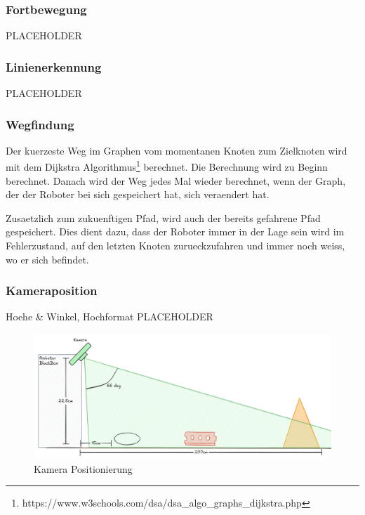 \subsubsection{Fortbewegung}

PLACEHOLDER

\subsubsection{Linienerkennung}

PLACEHOLDER

\subsubsection{Wegfindung}

Der kuerzeste Weg im Graphen vom momentanen Knoten zum Zielknoten wird mit dem Dijkstra Algorithmus\footnote{https://www.w3schools.com/dsa/dsa\_algo\_graphs\_dijkstra.php} berechnet. Die Berechnung wird zu Beginn berechnet. Danach wird der Weg jedes Mal wieder berechnet, wenn der Graph, der der Roboter bei sich gespeichert hat, sich veraendert hat.

Zusaetzlich zum zukuenftigen Pfad, wird auch der bereits gefahrene Pfad gespeichert. Dies dient dazu, dass der Roboter immer in der Lage sein wird im Fehlerzustand, auf den letzten Knoten zurueckzufahren und immer noch weiss, wo er sich befindet.

\subsubsection{Kameraposition}

Hoehe \& Winkel, Hochformat PLACEHOLDER

\begin{figure}[H]
    \centering
    \includegraphics[width=1\linewidth]{assets//informatik-prototyp//camera/camera_position.png}
    \caption{Kamera Positionierung}
    \label{fig:camera-position-concept}
\end{figure}

